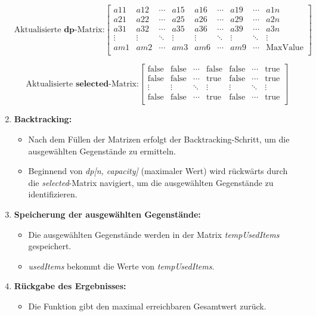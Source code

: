 \begin{enumerate}
    \[
        \text{Aktualisierte }\textbf{dp}\text{-Matrix:}
        \begin{bmatrix}
            a11 & a12 & \cdots & a15 & a16 & \cdots & a19 & \cdots & a1n \\
            a21 & a22 & \cdots & a25 & a26 & \cdots & a29 & \cdots & a2n \\
            a31 & a32 & \cdots & a35 & a36 & \cdots & a39 & \cdots & a3n \\
            \vdots & \vdots & \ddots & \vdots & \vdots & \ddots & \vdots & \ddots & \vdots \\
            am1 & am2 & \cdots & am3 & am6 & \cdots & am9 & \cdots & \text{MaxValue} \\
        \end{bmatrix}
    \]

    \[
        \text{Aktualisierte }\textbf{selected}\text{-Matrix:}
        \begin{bmatrix}
            \text{false} & \text{false} & \cdots & \text{false} & \text{false} & \cdots & \text{true} \\
            \text{false} & \text{false} & \cdots & \text{true} & \text{false} & \cdots & \text{true} \\
            \vdots & \vdots & \ddots & \vdots & \vdots & \ddots & \vdots \\
            \text{false} & \text{false} & \cdots & \text{true} & \text{false} & \cdots & \text{true} \\
        \end{bmatrix}
    \]

    \item \textbf{Backtracking:}
    \begin{itemize}
        \item Nach dem Füllen der Matrizen erfolgt der Backtracking-Schritt, um die ausgewählten Gegenstände zu ermitteln.
        \item Beginnend von \textit{dp[n, capacity]} (maximaler Wert) wird rückwärts durch die \textit{selected}-Matrix
        navigiert, um die ausgewählten Gegenstände zu identifizieren.
    \end{itemize}

    \item \textbf{Speicherung der ausgewählten Gegenstände:}
    \begin{itemize}
        \item Die ausgewählten Gegenstände werden in der Matrix \textit{tempUsedItems} gespeichert.
        \item \textit{usedItems} bekommt die Werte von \textit{tempUsedItems}.
    \end{itemize}

    \item \textbf{Rückgabe des Ergebnisses:}
    \begin{itemize}
        \item Die Funktion gibt den maximal erreichbaren Gesamtwert zurück.\\
    \end{itemize}
\end{enumerate}

